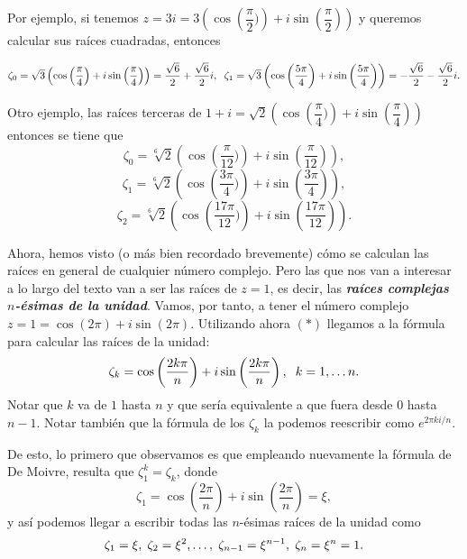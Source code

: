 \documentclass[12pt]{article}
\begin{document}
Por ejemplo, si tenemos $z = 3i= 3\left(\cos \left( \dfrac{\pi}{2})\right) + i\sin \left( \dfrac{\pi}{2} \right)\right)$ y queremos calcular sus raíces cuadradas, entonces \begin{center}$\zeta_{0} = \sqrt{3} \left( \cos \left( \dfrac{\pi}{4}\right) + i \sin \left( \dfrac{\pi}{4}\right)\right) = \dfrac{\sqrt{6}}{2} + \dfrac{\sqrt{6}}{2}i, \hspace{0.2cm} \zeta_{1} = \sqrt{3}\left( \cos \left( \dfrac{5 \pi}{4}\right) + i \sin \left( \dfrac{5 \pi}{4}\right)\right) =- \dfrac{\sqrt{6}}{2} - \dfrac{\sqrt{6}}{2}i.$\end{center}

Otro ejemplo, las raíces terceras de $1 + i = \sqrt{2}\left(\cos \left( \dfrac{\pi}{4})\right) + i\sin \left( \dfrac{\pi}{4} \right)\right)$ entonces se tiene que $$ \zeta_{0} = \sqrt[6]{2}\left(\cos \left( \dfrac{\pi}{12})\right) + i\sin \left( \dfrac{\pi}{12} \right)\right),$$ $$\zeta_{1} = \sqrt[6]{2}\left(\cos \left( \dfrac{3 \pi}{4})\right) + i\sin \left( \dfrac{3 \pi}{4} \right)\right),$$ $$\zeta_{2} = \sqrt[6]{2}\left(\cos \left( \dfrac{17 \pi}{12})\right) + i\sin \left( \dfrac{17 \pi}{12} \right)\right).$$

Ahora, hemos visto (o más bien recordado brevemente) cómo se calculan las raíces en general de cualquier número complejo. Pero las que nos van a interesar a lo largo del texto van a ser las raíces de $z = 1$, es decir, las \textbf{\textit{raíces complejas $n$-ésimas de la unidad}}. Vamos, por tanto, a tener el número complejo $z = 1 = \cos(2\pi) + i \sin (2\pi)$. Utilizando ahora $(\ast)$ llegamos a la fórmula para calcular las raíces de la unidad: $$\zeta_{k} = \cos \left( \dfrac{2k\pi}{n} \right) + i\sin \left( \dfrac{2k\pi}{n} \right), \hspace{0.2cm} k = 1, \ldots n.$$
Notar que $k$ va de $1$ hasta $n$ y que sería equivalente a que fuera desde $0$ hasta $n-1$. Notar también que la fórmula de los $\zeta_{k}$ la podemos reescribir como $e^{2\pi k i/n}$.

De esto, lo primero que observamos es que empleando nuevamente la fórmula de De Moivre, resulta que $\zeta_{1}^{k} = \zeta_{k}$, donde $$\zeta_{1} =  \cos \left( \dfrac{2\pi}{n} \right) + i\sin \left( \dfrac{2\pi}{n} \right) = \xi,$$ y así podemos llegar a escribir todas las $n$-ésimas raíces de la unidad como $$\zeta_{1} = \xi, \hspace{0.1cm} \zeta_{2} = \xi^{2}, \ldots, \hspace{0.1cm} \zeta_{n-1} = \xi^{n-1}, \hspace{0.1cm}\zeta_{n} = \xi^{n} = 1.$$
\end{document}

